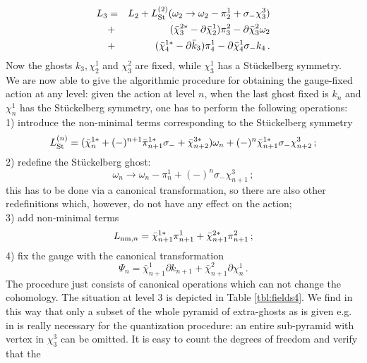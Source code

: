 \documentclass[a4paper,12pt]{article}
\begin{document}
\begin{eqnarray}
  L_3 &=& L_2 +  L_{\rm St}^{(2)}(\omega_2 \to \omega_2 - \pi_2^1 + \sigma_- 
  \chi_3^3) \nonumber \\
 &+&  ({\bar\chi}_3^{2*} - \partial \bar\chi_2^1 ) \pi_3^2 - \partial
 \bar\chi_3^2 \omega_2 \\ 
 &+& ({\bar\chi}_4^{1*} - \partial \bar k_3 ) \pi_4^1
   - \partial \bar\chi_4^1 \sigma_- k_4 \, . \nonumber
\end{eqnarray}
Now the ghosts $k_3, \chi_2^1$ and $\chi_3^2$ are fixed, while
$\chi_3^1$ has a St\"uckelberg symmetry. \\
We are now able to give the algorithmic procedure for obtaining the
gauge-fixed action at any level: given the action at level $n$, when the 
last ghost fixed is $k_n$ and $\chi_n^1$ has the St\"uckelberg
symmetry, one has to perform the following operations: \\
1) introduce the non-minimal terms corresponding to the
St\"uckelberg symmetry
\begin{equation}
  L_{\rm St}^{(n)} = ({\bar \chi}_n^{1*} + (-)^{n+1}
  {\bar\pi}_{n+1}^{1*} \sigma_- 
  + {\bar \chi}_{n+2}^{3*} ) \omega_n + (-)^n {\bar\chi}_{n+1}^{1*} \sigma_- 
  \chi_{n+2}^3 \, ;
\end{equation}
2) redefine the St\"uckelberg ghost:
\begin{equation}
  \omega_n \to \omega_n - \pi_n^1 + (-)^n \sigma_- \chi_{n+1}^3 \, ;
\end{equation}
this has to be done via a canonical transformation, so there are
also other redefinitions which, however, do not have any effect on the 
action; \\
3) add non-minimal terms
\begin{equation}
  L_{{\rm nm},n} = {\bar\chi}_{n+1}^{1*} \pi_{n+1}^1 + {\bar\chi}_{n+1}^{2*}
  \pi_{n+1}^2 \, ; 
\end{equation}
4) fix the gauge with the canonical transformation
\begin{equation}
  \Psi_n = \bar\chi_{n+1}^1 \partial k_{n+1} +  \bar\chi_{n+1}^2
  \partial \chi_n^1 \, . 
\end{equation}
The procedure just consists of canonical operations which can not
change the cohomology. 
The situation at level 3 is depicted in Table \ref{tbl:fields4}. 
We find in this way that only a subset of the whole pyramid of
extra-ghosts as is given e.g. in \cite{GH} is really necessary for
the quantization procedure: an entire sub-pyramid with
vertex in $\chi_3^3$ can be omitted. 
It is easy to count the degrees of freedom and verify that the
\end{document}
